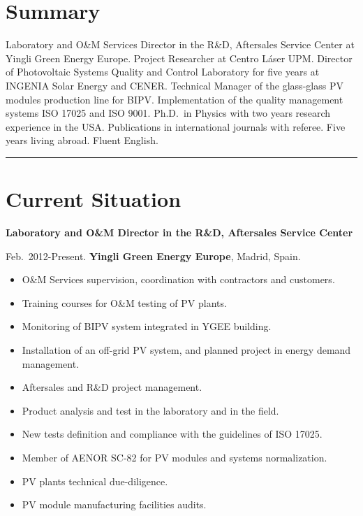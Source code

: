 \documentclass{article}
\begin{document}



\section*{Summary}

Laboratory and O{\&}M Services Director in the R{\&}D, Aftersales Service Center at Yingli Green Energy Europe. Project Researcher at Centro L\'aser UPM. Director of Photovoltaic Systems Quality and Control Laboratory for five years at INGENIA Solar Energy and CENER. Technical Manager of the glass-glass PV modules production line for BIPV. Implementation of the quality management systems ISO 17025 and ISO 9001. Ph.D.\ in Physics with two years research experience in the USA. Publications in international journals with referee. Five years living abroad. Fluent English.

\bigskip

\hrule


\section*{Current Situation}

{\bf Laboratory and O{\&}M Director in the R{\&}D, Aftersales Service Center}

\medskip
Feb.~2012-Present.
{\bf Yingli Green Energy Europe},
Madrid, Spain.

\begin{itemize}\itemsep 0pt
\item O{\&}M Services supervision, coordination with contractors and customers.
\item Training courses for O{\&}M testing of PV plants.
\item Monitoring of BIPV system integrated in YGEE building.
\item Installation of an off-grid PV system, and planned project in energy demand management.
\item Aftersales and R{\&}D project management.
\item Product analysis and test in the laboratory and in the field.
\item New tests definition and compliance with the guidelines of ISO 17025.
\item Member of AENOR SC-82 for PV modules and systems normalization.
\item PV plants technical due-diligence.
\item PV module manufacturing facilities audits.
\end{itemize}
\end{document}
